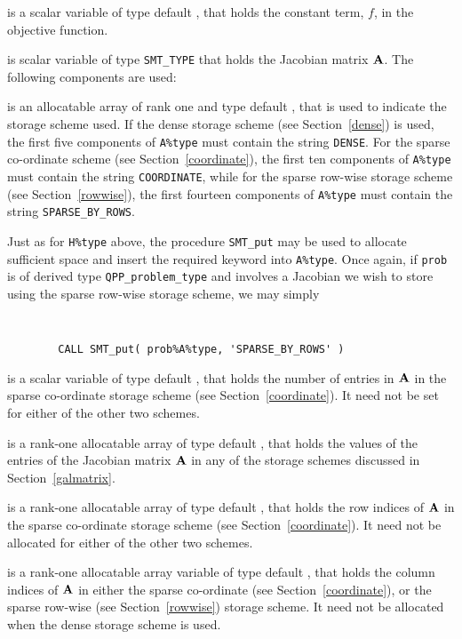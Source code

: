 \documentclass{galahad}
\newcommand{\packagename}{QPP}
\begin{document}
\begin{description}
 is a scalar variable of type 
default \realdp, that holds 
the constant term, $f$, in the objective function.

 is scalar variable of type {\tt SMT\_TYPE} 
that holds the Jacobian matrix ${\mathbf{A}}$. The following components are used:

\begin{description}

 is an allocatable array of rank one and type default \character, 
that is used to indicate the storage scheme used. If the dense storage scheme 
(see Section~\ref{dense}) is used, 
the first five components of {\tt A\%type} must contain the
string {\tt DENSE}.
For the sparse co-ordinate scheme (see Section~\ref{coordinate}), 
the first ten components of {\tt A\%type} must contain the
string {\tt COORDINATE}, while 
for the sparse row-wise storage scheme (see Section~\ref{rowwise}),
the first fourteen components of {\tt A\%type} must contain the
string {\tt SPARSE\_BY\_ROWS}.

Just as for {\tt H\%type} above, the procedure {\tt SMT\_put} 
may be used to allocate sufficient space and insert the required keyword
into {\tt A\%type}.
Once again, if {\tt prob} is of derived type {\tt \packagename\_problem\_type}
and involves a Jacobian we wish to store using the sparse row-wise 
storage scheme, we may simply
{\tt 
\begin{verbatim}
        CALL SMT_put( prob%A%type, 'SPARSE_BY_ROWS' )
\end{verbatim}
}
\noindent

 is a scalar variable of type default \integer, that 
holds the number of entries in ${\mathbf{A}}$
in the sparse co-ordinate storage scheme (see Section~\ref{coordinate}). 
It need not be set for either of the other two schemes.

 is a rank-one allocatable array of type default \realdp, that holds
the values of the entries of the Jacobian matrix ${\mathbf{A}}$ in any of the 
storage schemes discussed in Section~\ref{galmatrix}.

 is a rank-one allocatable array of type default \integer,
that holds the row indices of ${\mathbf{A}}$ in the sparse co-ordinate storage
scheme (see Section~\ref{coordinate}). 
It need not be allocated for either of the other two schemes.

 is a rank-one allocatable array variable of type default \integer,
that holds the column indices of ${\mathbf{A}}$ in either the sparse co-ordinate 
(see Section~\ref{coordinate}), or the sparse row-wise 
(see Section~\ref{rowwise}) storage scheme.
It need not be allocated when the dense storage scheme is used.


\end{description}
\end{description}
\end{document}
